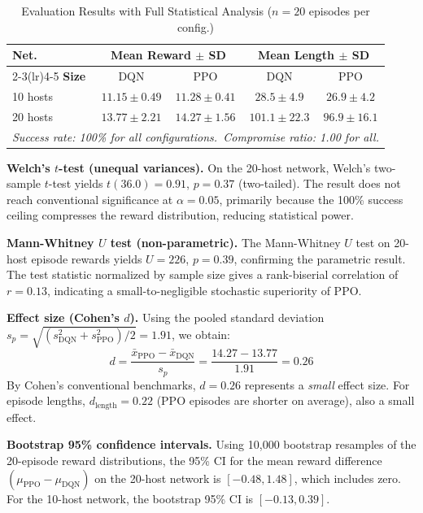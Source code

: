 \documentclass[conference]{IEEEtran}
\begin{document}
\begin{table}[h]
\centering
\caption{Evaluation Results with Full Statistical Analysis ($n = 20$ episodes per config.)}
\label{tab:results}
\begin{tabular}{lcccc}
\toprule
\textbf{Net.} & \multicolumn{2}{c}{\textbf{Mean Reward $\pm$ SD}} &
\multicolumn{2}{c}{\textbf{Mean Length $\pm$ SD}} \\
\cmidrule(lr){2-3}\cmidrule(lr){4-5}
\textbf{Size} & DQN & PPO & DQN & PPO \\
\midrule
10 hosts & $11.15 \pm 0.49$ & $11.28 \pm 0.41$ & $28.5 \pm 4.9$ & $26.9 \pm 4.2$ \\
20 hosts & $13.77 \pm 2.21$ & $14.27 \pm 1.56$ & $101.1 \pm 22.3$ & $96.9 \pm 16.1$ \\
\midrule
\multicolumn{5}{l}{\textit{Success rate: 100\% for all configurations.\ Compromise ratio: 1.00 for all.}} \\
\bottomrule
\end{tabular}
\end{table}

\textbf{Welch's $t$-test (unequal variances).}  On the 20-host network,
Welch's two-sample $t$-test yields $t(36.0) = 0.91$, $p = 0.37$
(two-tailed).  The result does not reach conventional significance at
$\alpha = 0.05$, primarily because the 100\% success ceiling compresses
the reward distribution, reducing statistical power.

\textbf{Mann-Whitney $U$ test (non-parametric).}  The Mann-Whitney $U$
test on 20-host episode rewards yields $U = 226$, $p = 0.39$,
confirming the parametric result.  The test statistic normalized by
sample size gives a rank-biserial correlation of $r = 0.13$,
indicating a small-to-negligible stochastic superiority of PPO.

\textbf{Effect size (Cohen's $d$).}  Using the pooled standard
deviation $s_p = \sqrt{(s_\text{DQN}^2 + s_\text{PPO}^2)/2} = 1.91$,
we obtain:
\begin{equation}
  d = \frac{\bar{x}_\text{PPO} - \bar{x}_\text{DQN}}{s_p}
    = \frac{14.27 - 13.77}{1.91} = 0.26
  \label{eq:cohend}
\end{equation}
By Cohen's conventional benchmarks, $d = 0.26$ represents a
\emph{small} effect size.  For episode lengths, $d_\text{length} = 0.22$
(PPO episodes are shorter on average), also a small effect.

\textbf{Bootstrap 95\% confidence intervals.}  Using 10,000 bootstrap
resamples of the 20-episode reward distributions, the 95\% CI for the
mean reward difference $(\mu_\text{PPO} - \mu_\text{DQN})$ on the
20-host network is $[-0.48, 1.48]$, which includes zero.  For the
10-host network, the bootstrap 95\% CI is $[-0.13, 0.39]$.
\end{document}
